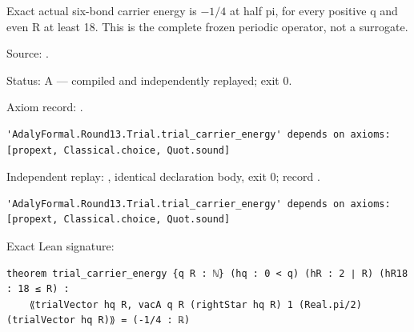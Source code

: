 \begin{theorem}[bp-429]
\label{bp-429}
\leanok
Exact actual six-bond carrier energy is \(-1/4\) at half pi, for every positive q and even R at least 18. This is the complete frozen periodic operator, not a surrogate.

\par Source: \texttt{}.
\par Status: A — compiled and independently replayed; exit 0.
\par Axiom record: \texttt{}.
\begin{verbatim}
'AdalyFormal.Round13.Trial.trial_carrier_energy' depends on axioms: [propext, Classical.choice, Quot.sound]
\end{verbatim}
\par Independent replay: \texttt{}, identical declaration body, exit 0; record \texttt{}.
\begin{verbatim}
'AdalyFormal.Round13.Trial.trial_carrier_energy' depends on axioms: [propext, Classical.choice, Quot.sound]
\end{verbatim}
\par Exact Lean signature:
\begin{verbatim}
theorem trial_carrier_energy {q R : ℕ} (hq : 0 < q) (hR : 2 ∣ R) (hR18 : 18 ≤ R) :
    ⟪trialVector hq R, vacA q R (rightStar hq R) 1 (Real.pi/2) (trialVector hq R)⟫ = (-1/4 : ℝ)
\end{verbatim}
\end{theorem}

